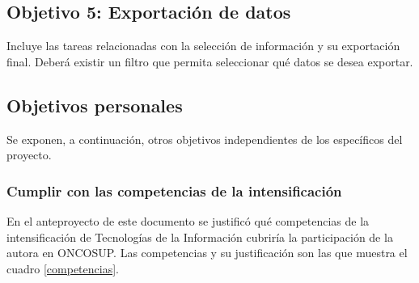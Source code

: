 \subsection{Objetivo 5: Exportación de datos}

Incluye las tareas relacionadas con la selección de información y su exportación final. Deberá existir un filtro que permita seleccionar qué datos se desea exportar.


\subsection{Objetivos personales}

Se exponen, a continuación, otros objetivos independientes de los específicos del proyecto.

\subsubsection{Cumplir con las competencias de la intensificación}

En el anteproyecto de este documento se justificó qué competencias de la intensificación de Tecnologías de la Información cubriría la participación de la autora en ONCOSUP. Las competencias y su justificación son las que muestra el cuadro \ref{competencias}.

